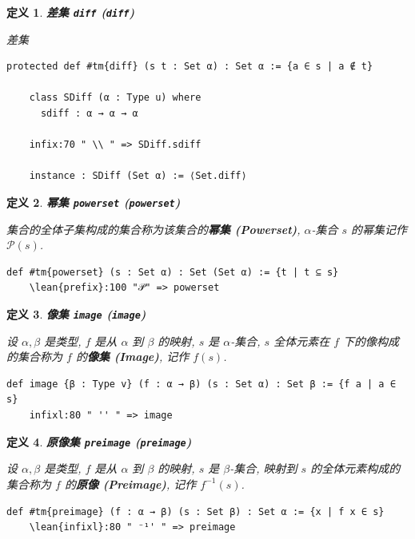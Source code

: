 \documentclass[UTF8]{ctexart}
\DeclareMathOperator{\0}{\mathbf{0}}                    %
\newcommand{\<}{\langle}
\renewcommand{\>}{\rangle}                              %
\newenvironment{dfn_box}{
    \begin{tcolorbox}[enhanced, colback=dfn_green2, boxrule=0pt, frame hidden,
        borderline west={0.7mm}{0.1mm}{dfn_green1},breakable]
    }
    {\end{tcolorbox}}
\theoremstyle{MyStyle} %
\newtheorem{definition}{定义}[subsection]
\newenvironment{dfn}[2]
{
    \begin{dfn_box}
        \begin{definition}
            \textbf{#1
                \ifx\relax#2\relax\else %
                    (#2) %
                \fi}
            \newline
}
{
        \end{definition}
    \end{dfn_box}
}
\newcommand*{\lean}[1]{\texttt{\color{blue}#1}}
\begin{document}
        \begin{dfn}
            {差集}
            {\texttt{diff}}
            差集
            \begin{lstlisting}[style=lean]
    protected def #tm{diff} (s t : Set α) : Set α := {a ∈ s | a ∉ t}
    
    class SDiff (α : Type u) where
      sdiff : α → α → α
    
    infix:70 " \\ " => SDiff.sdiff

    instance : SDiff (Set α) := ⟨Set.diff⟩
            \end{lstlisting}
        \end{dfn}
        
        \begin{dfn}
            {幂集}
            {\texttt{powerset}}
            集合的全体子集构成的集合称为该集合的\textbf{幂集 (Powerset)}, $\alpha$-集合 $s$ 的幂集记作 $\mathcal{P}(s)$. 
            \begin{lstlisting}[style=lean]
    def #tm{powerset} (s : Set α) : Set (Set α) := {t | t ⊆ s}
    \lean{prefix}:100 "𝒫" => powerset
            \end{lstlisting}
        \end{dfn}

        \begin{dfn}
            {像集}
            {\texttt{image}}
            设 $\alpha,\beta$ 是类型, $f$ 是从 $\alpha$ 到 $\beta$ 的映射, $s$ 是 $\alpha$-集合, $s$ 全体元素在 $f$ 下的像构成的集合称为 $f$ 的\textbf{像集 (Image)}, 记作 $f(s)$. 
            \begin{lstlisting}[style=lean]
    def image {β : Type v} (f : α → β) (s : Set α) : Set β := {f a | a ∈ s}
    infixl:80 " '' " => image
            \end{lstlisting}
        \end{dfn}

        \begin{dfn}
            {原像集}
            {\texttt{preimage}}
            设 $\alpha,\beta$ 是类型, $f$ 是从 $\alpha$ 到 $\beta$ 的映射, $s$ 是 $\beta$-集合, 映射到 $s$ 的全体元素构成的集合称为 $f$ 的\textbf{原像 (Preimage)}, 记作 $f^{-1}(s)$. 
            \begin{lstlisting}[style=lean]
    def #tm{preimage} (f : α → β) (s : Set β) : Set α := {x | f x ∈ s}
    \lean{infixl}:80 " ⁻¹' " => preimage
            \end{lstlisting}
        \end{dfn}
\end{document}
